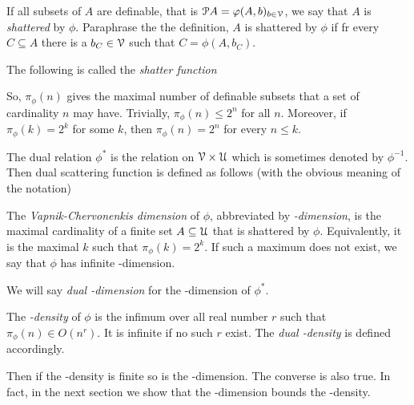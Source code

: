 \documentclass[sputnik.tex]{subfiles}
\begin{document}
If all subsets of $A$ are definable, that is $\EuScript P A=\varphi(A,b)_{b\in\EuScript V}$, we say that $A$ is \emph{shattered\/} by $\phi$. Paraphrase the the definition,  $A$ is shattered by $\phi$ if fr every $C\subseteq A$ there is a $b_C\in\EuScript V$ such that $C=\phi(A,b_C)$.

The following is called the \emph{shatter function\/}




So, $\pi_\phi(n)$ gives the maximal number of definable subsets that a set of cardinality $n$ may have.
Trivially, $\pi_\phi(n)\le2^n$ for all $n$.
Moreover, if $\pi_\phi(k)=2^k$ for some $k$, then $\pi_\phi(n)=2^n$ for every $n\le k$.

The dual relation $\phi^*$ is the relation on $\EuScript V\times\EuScript U$ which is sometimes denoted by $\phi^{-1}$.
Then dual scattering function is defined as follows (with the obvious meaning of the notation) 



\begin{definition}\label{def_VCdim}
The \emph{Vapnik-Cher\-vo\-nen\-kis dimension\/} of $\phi$, abbreviated by \emph{\vc-dimension}, is the maximal cardinality of a finite set $A\subseteq\EuScript U$ that is shattered by $\phi$.
Equivalently, it is the maximal $k$ such that $\pi_\phi(k)=2^k$.
If such a maximum does not exist,
we say that $\phi$ has infinite \vc-dimension.

We will say \emph{dual \vc-dimension\/} for the \vc-dimension of $\phi^*$.

The \emph{\vc-density\/} of $\phi$ is the infimum over all real number $r$ such that $\pi_\phi(n)\in O(n^r)$.
It is infinite if no such $r$ exist.
The  \emph{dual \vc-density\/} is defined accordingly.\QED
\end{definition}


Then if the \vc-density is finite so is the \vc-dimension.
The converse is also true.
In fact, in the next section we show that the \vc-dimension bounds the \vc-density.
\end{document}
